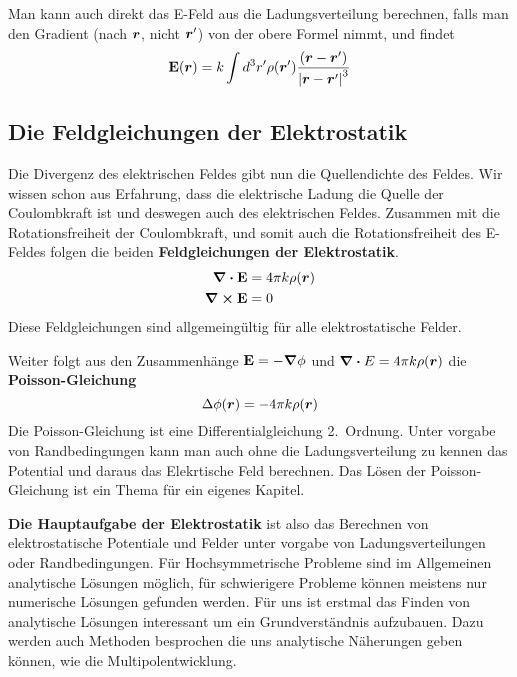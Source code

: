 Man kann auch direkt das E-Feld aus die Ladungsverteilung berechnen, falls 
man den Gradient (nach $\vb*r$, nicht $\vb*r'$) von der obere Formel nimmt, 
und findet
\begin{equation}
  \vb E(\vb*r) = k \int d^3r' 
  \rho(\vb*r')\frac{(\vb*r-\vb*r')}{\abs{\vb*r-\vb*r'}^3} 
\end{equation}

\subsection{Die Feldgleichungen der Elektrostatik}%
\label{ssub:Die-Feldgleichungen}
Die Divergenz des elektrischen Feldes gibt nun die Quellendichte des Feldes.
Wir wissen schon aus Erfahrung, dass die elektrische Ladung die Quelle der 
Coulombkraft ist und deswegen auch des elektrischen Feldes. Zusammen mit die
Rotationsfreiheit der Coulombkraft, und somit auch die Rotationsfreiheit des
E-Feldes folgen die beiden \textbf{Feldgleichungen der Elektrostatik}.
\begin{equation}
  \begin{aligned}
    \div \vb E &= 4\pi k \rho(\vb*r)\\
    \curl \vb E &= 0
  \end{aligned}
\end{equation}
Diese Feldgleichungen sind allgemeingültig für alle elektrostatische Felder.

Weiter folgt aus den Zusammenhänge $\vb E = -\grad \phi$ und 
$\div E = 4\pi k \rho(\vb*r)$ die \textbf{Poisson-Gleichung} 
\begin{equation}
  \Delta \phi(\vb*r) = - 4\pi k \rho(\vb*r)
\end{equation}
Die Poisson-Gleichung ist eine Differentialgleichung 2.\ Ordnung. Unter 
vorgabe von Randbedingungen kann man auch ohne die Ladungsverteilung zu 
kennen das Potential und daraus das Elekrtische Feld berechnen. Das Lösen
der Poisson-Gleichung ist ein Thema für ein eigenes Kapitel. 

\textbf{Die Hauptaufgabe der Elektrostatik} ist also das Berechnen von 
elektrostatische Potentiale und Felder unter vorgabe von 
Ladungsverteilungen oder Randbedingungen. 
Für Hochsymmetrische Probleme sind im Allgemeinen analytische 
Lösungen möglich, für schwierigere Probleme können meistens nur numerische 
Lösungen gefunden werden. Für uns ist erstmal das Finden von analytische
Lösungen interessant um ein Grundverständnis aufzubauen. Dazu werden auch
Methoden besprochen die uns analytische Näherungen geben können, wie die
Multipolentwicklung.
